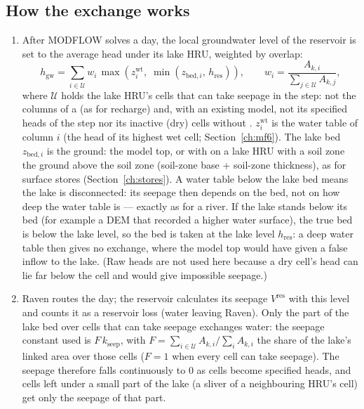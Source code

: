 \subsection{How the exchange works}
\begin{enumerate}
\item After MODFLOW solves a day, the local groundwater level of the reservoir is set to the average head under its
lake HRU, weighted by overlap:
\begin{equation}
h_{\mathrm{gw}}=\sum_{i\in\mathcal{U}}w_i\,\max\!\left(z^{\mathrm{wt}}_i,\;\min\!\left(z_{\mathrm{bed},i},\,h_{\mathrm{res}}\right)\right),\qquad w_i=\frac{A_{k,i}}{\sum_{j\in\mathcal{U}}A_{k,j}} ,
\end{equation}
where $\mathcal{U}$ holds the lake HRU's cells that can take seepage in the step: not the columns of a
 (as for recharge) and, with an existing model, not its specified heads of the step nor its
inactive (dry) cells without . $z^{\mathrm{wt}}_i$ is the water table of column $i$ (the head of its highest wet
cell; Section~\ref{ch:mf6}). The lake bed $z_{\mathrm{bed},i}$ is the ground: the model top, or with
 on a lake HRU with a soil zone the ground above the soil zone (soil-zone base + soil-zone
thickness), as for surface stores (Section~\ref{ch:stores}). A water table below the lake bed means the lake is
disconnected: its seepage then depends on the bed, not on how deep the water table is --- exactly as for a river. If the
lake stands below its bed (for example a DEM that recorded a higher water surface), the true bed is below the lake level,
so the bed is taken at the lake level $h_{\mathrm{res}}$: a deep water table then gives no exchange, where the model top
would have given a false inflow to the lake. (Raw heads are not used here because a dry cell's head can lie far below the
cell and would give impossible seepage.)
\item Raven routes the day; the reservoir calculates its seepage $V^{\mathrm{res}}$ with this level and counts it as a
reservoir loss (water leaving Raven). Only the part of the lake bed over cells that can take seepage exchanges water: the
seepage constant used is $F\,k_{\mathrm{seep}}$, with $F=\sum_{i\in\mathcal{U}}A_{k,i}/\sum_iA_{k,i}$ the share of the
lake's linked area over those cells ($F=1$ when every cell can take seepage). The seepage therefore falls continuously
to 0 as cells become specified heads, and cells left under a small part of the lake (a sliver of a neighbouring HRU's
cell) get only the seepage of that part.

\end{enumerate}
